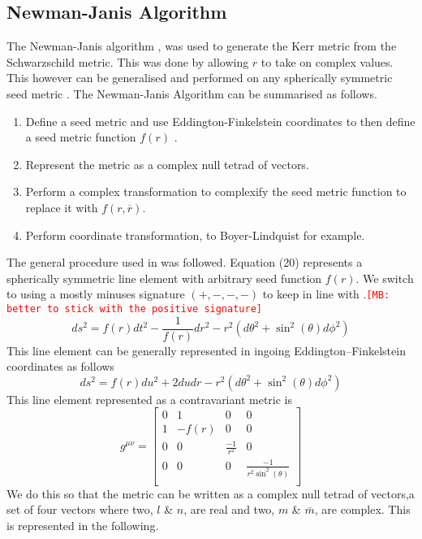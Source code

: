 \documentclass[12pt]{iopart}
\def\mbc#1{\textcolor{red}{\tt[MB: #1]}}
\begin{document}
 \subsection{Newman-Janis Algorithm}
 The Newman-Janis algorithm \cite{Newman:1965tw}, was used to generate the Kerr metric from the Schwarzschild metric. This was done by allowing $r$ to take on complex values. This however can be generalised and performed on any spherically symmetric seed metric \cite{Drake:1997hh} \cite{Drake:1998gf}. The Newman-Janis Algorithm can be summarised as follows. 
 \begin{enumerate}
  \item Define a seed metric and use Eddington-Finkelstein coordinates to then define a seed metric function $f(r)$ .
  \item Represent the metric as a complex null tetrad of vectors.
   \item Perform a complex transformation to complexify the seed metric function to replace it with $f(r,\overline{r})$.
   \item Perform coordinate transformation, to Boyer-Lindquist for example.
 \end{enumerate}
 The general procedure used in \cite{Drake:1997hh} \cite{Drake:1998gf} was followed. Equation (20) represents a spherically symmetric line element with arbitrary seed function $f(r)$. We switch to using a mostly minuses signature $(+,-,-,-)$ to keep in line with \cite{Drake:1997hh}.\mbc{better to stick with the positive signature}
 \begin{equation} 
     ds^2=  f(r)dt^2-\frac{1}{f(r)}dr^2-r^2(d\theta^2+\sin^2(\theta)d\phi^2)
 \end{equation}
 This line element can be generally represented in ingoing Eddington–Finkelstein coordinates as follows
 \begin{equation} 
     ds^2=  f(r)du^2+2dudr-r^2(d\theta^2+\sin^2(\theta)d\phi^2)
\end{equation}
This line element represented as a contravariant metric is
\\
\[
   g^{\mu \nu}= 
  \left[ {\begin{array}{ccccc}
0 & 1 & 0 & 0\\
1 & -f(r) & 0 & 0\\
0 & 0 & \frac{-1}{r^2} & 0\\
0 & 0 & 0 & \frac{-1}{r^2\sin^2(\theta)}\\
  \end{array} } \right]
\]
 We do this so that the metric can be written as a complex null tetrad of vectors,a set of four vectors where two, $l$ \& $n$, are real and two, $m$ \& $\bar{m}$, are complex. This is represented in the following.
\end{document}
